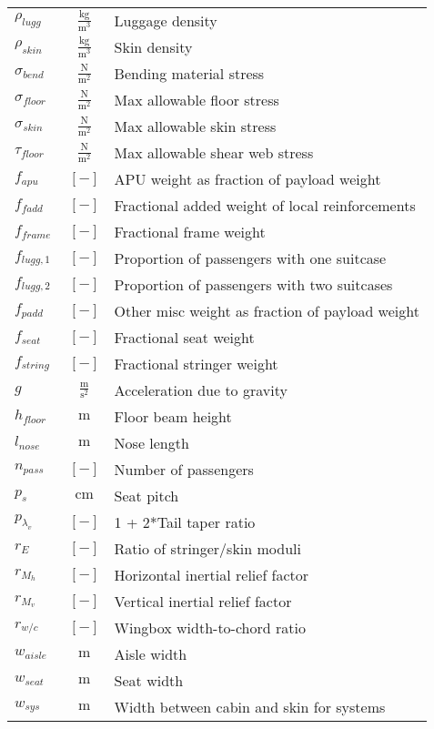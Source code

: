 \documentclass[12pt]{article}
\begin{document}
{\begin{supertabular}{lcl}
$\rho_{lugg}$ & $~\mathrm{\tfrac{kg}{m^{3}}}$ & Luggage density \\
$\rho_{skin}$ & $~\mathrm{\tfrac{kg}{m^{3}}}$ & Skin density \\
$\sigma_{bend}$ & $~\mathrm{\tfrac{N}{m^{2}}}$ & Bending material stress \\
$\sigma_{floor}$ & $~\mathrm{\tfrac{N}{m^{2}}}$ & Max allowable floor stress \\
$\sigma_{skin}$ & $~\mathrm{\tfrac{N}{m^{2}}}$ & Max allowable skin stress \\
$\tau_{floor}$ & $~\mathrm{\tfrac{N}{m^{2}}}$ & Max allowable shear web stress \\
$f_{apu}$ & $~[-]$ & APU weight as fraction of payload weight \\
$f_{fadd}$ & $~[-]$ & Fractional added weight of local reinforcements \\
$f_{frame}$ & $~[-]$ & Fractional frame weight \\
$f_{lugg,1}$ & $~[-]$ & Proportion of passengers with one suitcase \\
$f_{lugg,2}$ & $~[-]$ & Proportion of passengers with two suitcases \\
$f_{padd}$ & $~[-]$ & Other misc weight as fraction of payload weight \\
$f_{seat}$ & $~[-]$ & Fractional seat weight \\
$f_{string}$ &  $~[-]$  & Fractional stringer weight \\
$g$ & $~\mathrm{\tfrac{m}{s^{2}}}$ & Acceleration due to gravity \\
$h_{floor}$ & $~\mathrm{m}$ & Floor beam height \\
$l_{nose}$ & $~\mathrm{m}$ & Nose length \\
$n_{pass}$ & $~[-]$ & Number of passengers\\	
$p_s$ & $~\mathrm{cm}$ & Seat pitch \\
$p_{\lambda_v}$ & $~[-]$ & 1 + 2*Tail taper ratio \\
$r_E$ & $~[-]$ & Ratio of stringer/skin moduli \\
$r_{M_h}$ & $~[-]$ & Horizontal inertial relief factor \\
$r_{M_v}$ & $~[-]$ & Vertical inertial relief factor \\
$r_{w/c}$ & $~[-]$ & Wingbox width-to-chord ratio \\
$w_{aisle}$ & $~\mathrm{m}$ & Aisle width \\
$w_{seat}$ & $~\mathrm{m}$ & Seat width \\
$w_{sys}$ & $~\mathrm{m}$ & Width between cabin and skin for systems \\
\bottomrule
\end{supertabular}}

 
\end{document}
